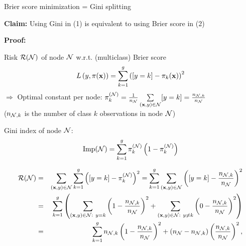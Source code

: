 \documentclass[11pt,compress,t,notes=noshow, xcolor=table]{beamer}
\begin{document}
\begin{vbframe}{Brier score minimization = Gini splitting}

\textbf{Claim:} Using Gini in (1) 
    is equivalent to using Brier score in (2) %
    


\textbf{Proof:} %

Risk $\mathcal{R}(\mathcal{N})$ of node $\mathcal{N}$ w.r.t. (multiclass) Brier score
$$
  L\left(y, \pi(\mathbf{x})\right) = \sum_{k = 1}^g \left([y = k] - \pi_k(\mathbf{x})\right)^2
$$
$\Rightarrow$ Optimal constant per node: $\pi_k^{(\mathcal{N})} = \frac{1}{n_{\mathcal{N}}} \sum\limits_{(\mathbf{x},y) \in \mathcal{N}} [y = k] = \frac{n_{\mathcal{N},k}}{n_{\mathcal{N} }}$ \\ ($n_{\mathcal{N},k}$ is the number of class $k$ observations in node $\mathcal{N}$) \\

\lz

Gini index of node $\mathcal{N}$:
$$
\text{Imp}(\Np) = \sum_{k=1}^g \pikN \left(1-\pikN \right) %
$$


\begin{footnotesize}



  



\framebreak

\begin{eqnarray*}
\mathcal{R}(\mathcal{N}) &=& \sum_{(\mathbf{x}, y) \in \mathcal{N}}  \sum_{k = 1}^g \left([y = k] - \pi_k^{(\mathcal{N})}\right)^2 
= \sum_{k = 1}^g \sum_{(\mathbf{x}, y) \in \mathcal{N}} \left([y = k] - \frac{n_{\mathcal{N},k}}{n_{\mathcal{N} }}\right)^2\\
&=& \sum_{k = 1}^{g} \left(\sum_{(\mathbf{x}, y) \in \mathcal{N}: ~ y = k} \left(1 - \frac{n_{\mathcal{N},k}}{n_{\mathcal{N} }}\right)^2 + \sum_{(\mathbf{x}, y) \in \mathcal{N}: ~ y \ne k} \left(0 - \frac{n_{\mathcal{N},k}}{n_{\mathcal{N} }}\right)^2\right) \\
&=& \sum_{k = 1}^g n_{\mathcal{N},k}\left(1 - \frac{n_{\mathcal{N},k}}{n_{\mathcal{N} }}\right)^2 + (n_{\mathcal{N} } - n_{\mathcal{N},k})\left(\frac{n_{\mathcal{N},k}}{n_{\mathcal{N} }}\right)^2, 
\end{eqnarray*}


\end{footnotesize}
\end{vbframe}
\end{document}
